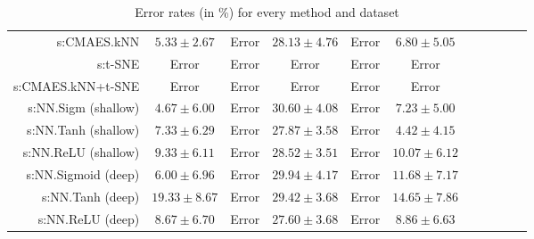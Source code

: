 \begin{table}[ht]
{\begin{tabular}{rcccccccccc}
s:CMAES.kNN & $5.33\pm2.67$ & Error  & $28.13\pm4.76$ & Error  & $6.80\pm5.05$ \\
s:t-SNE & Error  & Error  & Error  & Error  & Error  \\
s:CMAES.kNN+t-SNE & Error  & Error  & Error  & Error  & Error  \\
s:NN.Sigm (shallow) & $\bm{4.67\pm6.00}$ & Error  & $30.60\pm4.08$ & Error  & $7.23\pm5.00$ \\
s:NN.Tanh (shallow) & $7.33\pm6.29$ & Error  & $27.87\pm3.58$ & Error  & $4.42\pm4.15$ \\
s:NN.ReLU (shallow) & $9.33\pm6.11$ & Error  & $28.52\pm3.51$ & Error  & $10.07\pm6.12$ \\
s:NN.Sigmoid (deep) & $6.00\pm6.96$ & Error  & $29.94\pm4.17$ & Error  & $11.68\pm7.17$ \\
s:NN.Tanh (deep) & $19.33\pm8.67$ & Error  & $29.42\pm3.68$ & Error  & $14.65\pm7.86$ \\
s:NN.ReLU (deep) & $8.67\pm6.70$ & Error  & $\bm{27.60\pm3.68}$ & Error  & $8.86\pm6.63$ \\


\bottomrule
\end{tabular}
}
\caption{Error rates (in \%) for every method and dataset} \label{tab:dim-error-rates}
\end{table}

